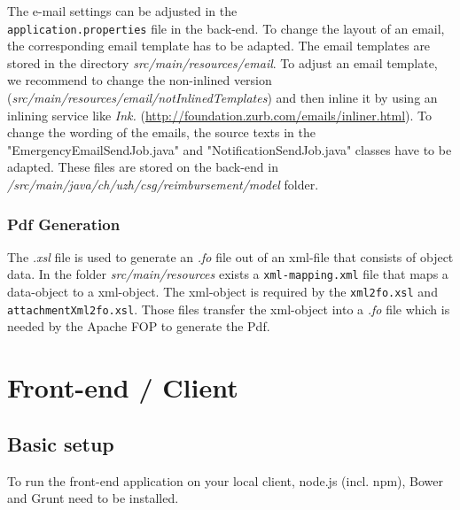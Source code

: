 The e-mail settings can be adjusted in the \\ \texttt{application.properties} file in the back-end. To change the layout of an email, the corresponding email template has to be adapted. The email templates are stored in the directory \textit{src/main/resources/email}. To adjust an email template, we recommend to change the non-inlined version (\textit{src/main/resources/email/notInlinedTemplates}) and then inline it by using an inlining service like \textit{Ink.} (\url{http://foundation.zurb.com/emails/inliner.html}). To change the wording of the emails, the source texts in the "EmergencyEmailSendJob.java" and "NotificationSendJob.java" classes have to be adapted. These files are stored on the back-end in \textit{/src/main/java/ch/uzh/csg/reimbursement/model} folder.

\subsubsection{Pdf Generation}
\label{subsubsec:pdf-xml-mappings}

The \textit{.xsl} file is used to generate an \textit{.fo} file out of an xml-file that consists of object data. In the folder \textit{src/main/resources} exists a \texttt{xml-mapping.xml} file that maps a data-object to a xml-object. The xml-object is required by the \texttt{xml2fo.xsl} and \texttt{attachmentXml2fo.xsl}. Those files transfer the xml-object into a \textit{.fo} file which is needed by the Apache FOP to generate the Pdf.



\section{Front-end / Client}

\subsection{Basic setup}
To run the front-end application on your local client, node.js (incl. npm), Bower and Grunt need to be installed.

